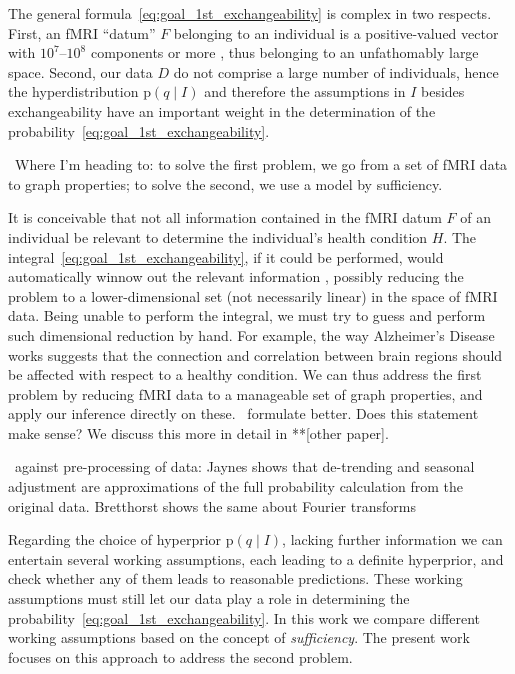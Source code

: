 \documentclass[\ifafour a4paper,12pt,\else a5paper,10pt,\fi%
onecolumn,oneside,article,%
british%
]{memoir}
\theoremstyle{remark}
\theoremstyle{innote}
\newcommand*{\citep}{\parencites}
\newcommand*{\citey}{\parencites*}
\newcommand*{\pf}{\mathrm{p}}%
\renewcommand*{\|}{\mathpunct{|}}
\newcommand*{\sects}{\S\S}%
\newcommand*{\chap}{ch.}%
\newcommand*{\puzzle}{\maltese}
\newcommand{\mynote}[1]{ {\footnotesize\color{notecolour}\puzzle\ #1} }
\newcommand*{\yH}{H}
\newcommand*{\yD}{D}
\newcommand*{\yF}{F}
\newcommand*{\yp}{q}
\newcommand*{\yI}{I}
\theoremstyle{plain}
\begin{document}
\medskip

The general formula~\eqref{eq:goal_1st_exchangeability} is complex in
two respects. First, an fMRI \enquote{datum} $\yF$ belonging to an
individual is a positive-valued vector with $10^7$--$10^8$ components or
more \citep{lindquist2008}, thus belonging to an unfathomably large
space. Second, our data $\yD$ do not comprise a large number of
individuals, hence the hyperdistribution $\pf(\yp \|\yI)$ and therefore the
assumptions in $\yI$ besides exchangeability have an important weight in
the determination of the probability~\eqref{eq:goal_1st_exchangeability}.

\mynote{Where I'm heading to: to solve the first problem, we go from a set
  of fMRI data to graph properties; to solve the second, we use a model by
  sufficiency.}

It is conceivable that not all information contained in the fMRI datum
$\yF$ of an individual be relevant to determine the individual's health
condition $\yH$. The integral~\eqref{eq:goal_1st_exchangeability}, if it
could be performed, would automatically winnow out the relevant information
\citep[\chap~17]{jaynes1994_r2003}, possibly reducing the problem to a
lower-dimensional set (not necessarily linear) in the space of fMRI data.
Being unable to perform the integral, we must try to guess and perform such
dimensional reduction by hand. For example, the way Alzheimer's Disease
works suggests that the connection and correlation between brain regions
should be affected with respect to a healthy condition. We can thus address
the first problem by reducing fMRI data to a manageable set of graph
properties, and apply our inference directly on these. \mynote{formulate
  better. Does this statement make sense?} We discuss this more in detail
in **[other paper].


\mynote{against pre-processing of data: Jaynes \citey[\sects~17.5.1,
  17.10]{jaynes1994_r2003} shows that de-trending and seasonal adjustment
  are approximations of the full probability calculation from the original
  data. Bretthorst \citey{bretthorst1988,bretthorst1990} shows the same
  about Fourier transforms}

Regarding the choice of hyperprior $\pf(\yp \|\yI)$, lacking further
information we can entertain several working assumptions, each leading to a
definite hyperprior, and check whether any of them leads to reasonable
predictions. These working assumptions must still let our data play a role
in determining the probability~\eqref{eq:goal_1st_exchangeability}. In this
work we compare different working assumptions based on the concept of
\emph{sufficiency}. The present work focuses on this approach to address
the second problem.
\end{document}
